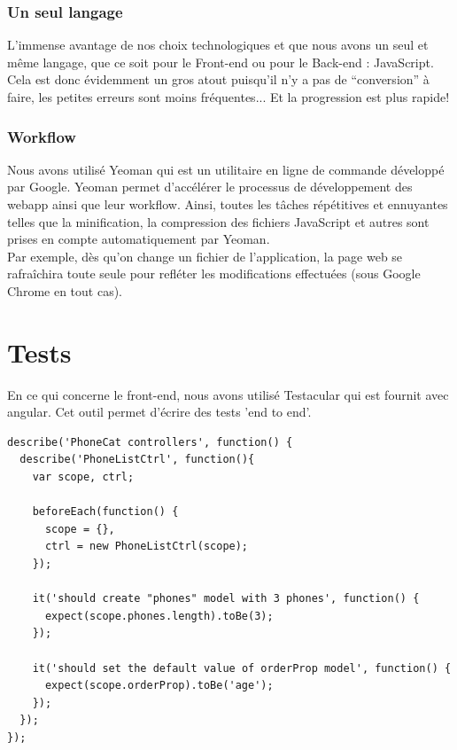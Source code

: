 \documentclass{report}
\begin{document}
\subsection{Un seul langage}
L'immense avantage de nos choix  technologiques et que nous avons un seul et même langage, que ce soit pour le Front-end ou pour le Back-end : JavaScript. Cela est donc évidemment un gros atout puisqu'il n'y a pas de “conversion” à faire, les petites erreurs sont moins fréquentes... Et la progression est plus rapide!

\subsection{Workflow}
Nous avons utilisé Yeoman qui est un utilitaire en ligne de commande développé par Google. Yeoman permet d'accélérer le processus de développement des webapp ainsi que leur workflow. Ainsi, toutes les tâches répétitives et ennuyantes telles que la minification, la compression des fichiers JavaScript et autres sont prises en compte automatiquement par Yeoman.\\

Par exemple, dès qu'on change un fichier de l'application, la page web se rafraîchira toute seule pour refléter les modifications effectuées (sous Google Chrome en tout cas).

\chapter{Tests}
En ce qui concerne le front-end, nous avons utilisé Testacular qui est fournit avec angular. Cet outil permet d'écrire des tests 'end to end'.
\begin{lstlisting}
describe('PhoneCat controllers', function() {
  describe('PhoneListCtrl', function(){
    var scope, ctrl;
 
    beforeEach(function() {
      scope = {},
      ctrl = new PhoneListCtrl(scope);
    });
    
    it('should create "phones" model with 3 phones', function() {
      expect(scope.phones.length).toBe(3);
    });

    it('should set the default value of orderProp model', function() {
      expect(scope.orderProp).toBe('age');
    });
  });
});
\end{lstlisting}
\newpage
\end{document}
